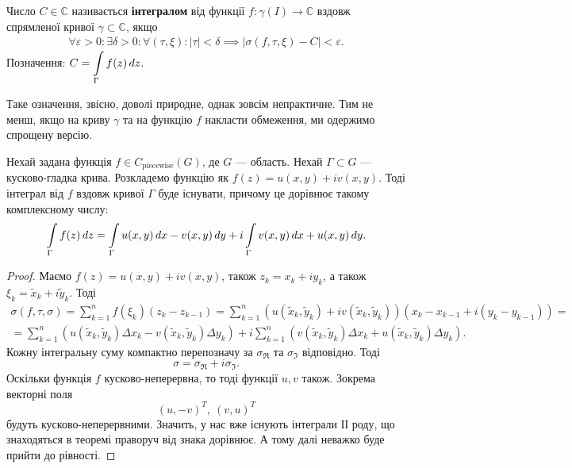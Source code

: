 \documentclass{math_library}
\begin{document}
\begin{definition}
Число $C \in \mathbb{C}$ називається \textbf{інтегралом} від функції $f \colon \gamma(I) \to \mathbb{C}$ вздовж спрямленої кривої $\gamma \subset \mathbb{C}$, якщо
\begin{align*}
\forall \varepsilon > 0: \exists \delta > 0: \forall (\tau,\xi): |\tau| < \delta \implies |\sigma(f,\tau,\xi) - C| < \varepsilon.
\end{align*}
Позначення: $C = \displaystyle\int\displaylimits_\Gamma f(z)\,dz$.
\end{definition}

Таке означення, звісно, доволі природне, однак зовсім непрактичне. Тим не менш, якщо на криву $\gamma$ та на функцію $f$ накласти обмеження, ми одержимо спрощену версію.

\begin{theorem}
Нехай задана функція $f \in C_{\text{piecewise}}(G)$, де $G$ --- область. Нехай $\Gamma \subset G$ --- кусково-гладка крива. Розкладемо функцію як $f(z) = u(x,y) + iv(x,y)$. Тоді інтеграл від $f$ вздовж кривої $\Gamma$ буде існувати, причому це дорівнює такому комплексному числу:
\begin{align*}
\int\displaylimits_\Gamma f(z)\,dz = \int\displaylimits_\Gamma u(x,y)\,dx - v(x,y)\,dy + i \int\displaylimits_\Gamma v(x,y)\,dx + u(x,y)\,dy.
\end{align*}
\end{theorem}

\begin{proof}
Маємо $f(z) = u(x,y) + iv(x,y)$, також $z_k = x_k + iy_k$, а також $\xi_k = \tilde{x}_k + i \tilde{y}_k$. Тоді
\begin{multline*}
\sigma(f,\tau,\sigma) = \displaystyle\sum_{k=1}^n f(\xi_k) (z_k-z_{k-1}) = \sum_{k=1}^n (u(\tilde{x}_k,\tilde{y}_k)+iv(\tilde{x}_k,\tilde{y}_k))(x_k-x_{k-1} + i(y_k-y_{k-1})) = \\
= \sum_{k=1}^n (u(\tilde{x}_k, \tilde{y}_k) \Delta x_k - v(\tilde{x}_k, \tilde{y}_k) \Delta y_k ) + i \sum_{k=1}^n (v(\tilde{x}_k, \tilde{y}_k) \Delta x_k + u(\tilde{x}_k, \tilde{y}_k) \Delta y_k ).
\end{multline*}
Кожну інтегральну суму компактно перепозначу за $\sigma_{\Re}$ та $\sigma_{\Im}$ відповідно. Тоді
\[
\sigma = \sigma_{\Re} + i \sigma_{\Im}.
\]
Оскільки функція $f$ кусково-неперервна, то тоді функції $u,v$ також. Зокрема векторні поля 
\[
(u,-v)^T,\ (v,u)^T
\]
будуть кусково-неперервними. Значить, у нас вже існують інтеграли ІІ роду, що знаходяться в теоремі праворуч від знака дорівнює. А тому далі неважко буде прийти до рівності.
\end{proof}
\end{document}
